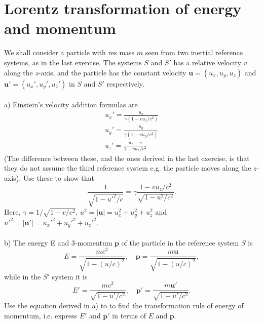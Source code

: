 \documentclass{article}
\begin{document}
    \section{Lorentz transformation of energy and momentum}
    We shall consider a particle with res mass $m$ seen from two inertial reference systems, as in the last exercise. The systems $S$ and $S'$ has a relative velocity $v$ along the $z$-axis, and the particle has the constant velocity $\mathbf{u} = (u_x, u_y, u_z)$ and $\mathbf{u'} = (u_x', u_y', u_z')$ in $S$ and $S'$ respectively. \\ \\
    a) Einstein's velocity addition formulas are
    \begin{align*}
        u_x' = \frac{u_x}{\gamma(1 - v u_z/c^2)} \\
        u_y' = \frac{u_y}{\gamma(1 - v u_y/c^2)} \\
        u_z' = \frac{u_z - v}{1 - v u_z/c^2}
    \end{align*}
    (The difference between these, and the ones derived in the last exercise, is that they do not assume the third reference system e.g. the particle moves along the $z$-axis). Use these to show that
    \begin{equation*}
        \frac{1}{\sqrt{1 - u'^2/c}} = \gamma \frac{1 - v u_z / c^2}{\sqrt{1 - u^2/c^2}}.
    \end{equation*}
    Here, $\gamma = 1 / \sqrt{1 - v/c^2}$, $u^2= |\mathbf{u}| = u_x^2 + u_y^2 + u_z^2$ and $u'^2= |\mathbf{u}'|= u_x'^2 + u_y'^2 + u_z'^2$. \\ \\
    b) The energy E and 3-momentum $\mathbf{p}$ of the particle in the reference system $S$ is
    \begin{equation*}
        E = \frac{mc^2}{\sqrt{1 - (u/c)^2}}, \quad \mathbf{p} =\frac{m\mathbf{u}}{\sqrt{1 - (u/c)^2}},
    \end{equation*}
    while in the $S'$ system it is
    \begin{equation*}
        E' = \frac{mc^2}{\sqrt{1 - u'/c^2}}, \quad \mathbf{p'} =\frac{m\mathbf{u'}}{\sqrt{1 - u'/c^2}}.
    \end{equation*}
    Use the equation derived in a) to to find the transformation rule of energy of momentum, i.e. express $E'$ and $\mathbf{p}'$ in terms of $E$ and $\mathbf{p}$.
\end{document}
